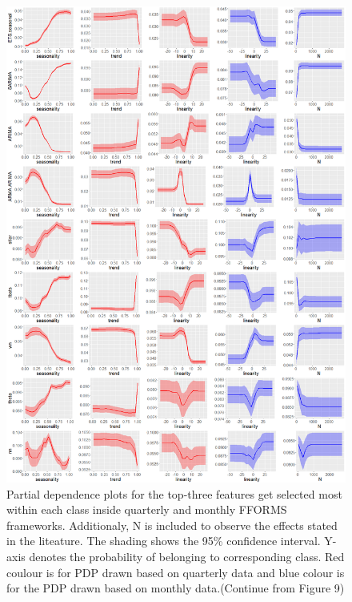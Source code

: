 \documentclass[11pt,a4paper,]{article}
\begin{document}
\begin{figure}
\centering
\includegraphics{figures/pdpquarterly2-1.png}
\caption{\label{fig:pdpquarterly2}Partial dependence plots for the top-three
features get selected most within each class inside quarterly and
monthly FFORMS frameworks. Additionaly, N is included to observe the
effects stated in the liteature. The shading shows the 95\% confidence
interval. Y-axis denotes the probability of belonging to corresponding
class. Red coulour is for PDP drawn based on quarterly data and blue
colour is for the PDP drawn based on monthly data.(Continue from Figure
9)}
\end{figure}

\newpage
\end{document}
